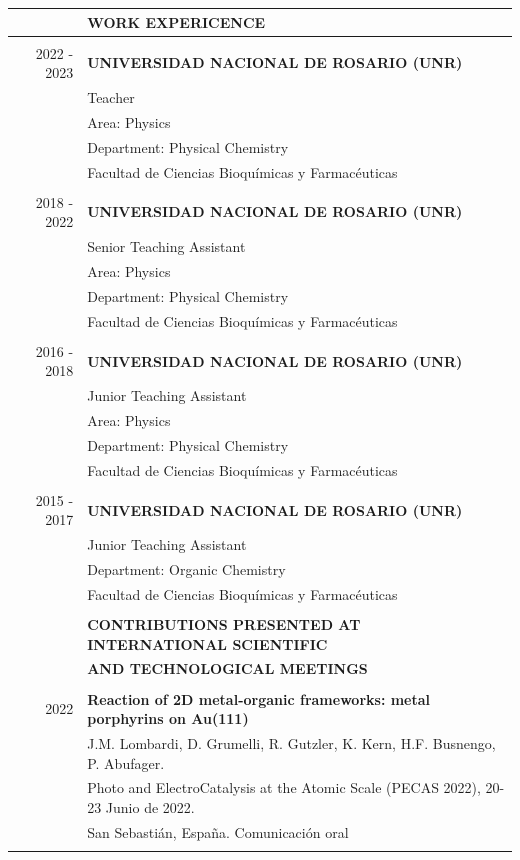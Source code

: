 \documentclass[11pt]{article}
\newcommand{\largespace}{\\[2pt]}
\newcommand{\mediumspace}{\\[-3pt]}
\newcommand{\smallspace}{\\[-5pt]}
\newcommand{\titlefont}[1]{\uppercase{\textbf{\Large{#1}}}}
\begin{document}
\begin{tcbposter}[
    poster = {columns=1, rows=1, spacing=0pt},
    boxes = {sharp corners, halign=center, valign=center, boxrule=0pt}
]
{\begin{tabular}{>{\footnotesize}rl}
        & \titlefont{Work Expericence} \\
        \hline \mediumspace

        2022 - 2023
            & \textbf{UNIVERSIDAD NACIONAL DE ROSARIO (UNR)} \\
            & Teacher \\
            & Area: Physics \\
            & Department: Physical Chemistry \\
            & Facultad de Ciencias Bioquímicas y Farmacéuticas \\
            & \smallspace

        2018 - 2022
            & \textbf{UNIVERSIDAD NACIONAL DE ROSARIO (UNR)} \\
            & Senior Teaching Assistant \\
            & Area: Physics \\
            & Department: Physical Chemistry \\
            & Facultad de Ciencias Bioquímicas y Farmacéuticas \\
            & \smallspace

        2016 - 2018
            & \textbf{UNIVERSIDAD NACIONAL DE ROSARIO (UNR)} \\
            & Junior Teaching Assistant \\
            & Area: Physics \\
            & Department: Physical Chemistry \\
            & Facultad de Ciencias Bioquímicas y Farmacéuticas \\
            & \smallspace

        2015 - 2017
            & \textbf{UNIVERSIDAD NACIONAL DE ROSARIO (UNR)} \\
            & Junior Teaching Assistant \\
            & Department: Organic Chemistry \\
            & Facultad de Ciencias Bioquímicas y Farmacéuticas \\
            & \largespace

        & \titlefont{Contributions presented at international scientific} \\ 
        & \titlefont{and technological meetings} \\
        \hline \mediumspace

        2022
            & \textbf{Reaction of 2D metal-organic frameworks: metal porphyrins on Au(111)} \\
            & J.M. Lombardi, D. Grumelli, R. Gutzler, K. Kern, H.F. Busnengo, P. Abufager. \\
            & Photo and ElectroCatalysis at the Atomic Scale (PECAS 2022), 20-23 Junio de 2022. \\
            & San Sebastián, España. Comunicación oral \\
            & \smallspace


\end{tabular}}
\end{tcbposter}
\end{document}
